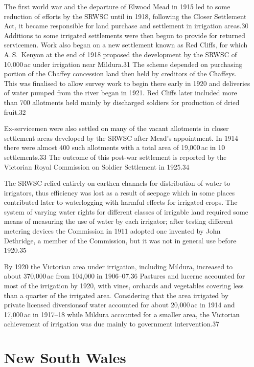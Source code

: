The first world war and the departure of Elwood Mead in 1915 led to
some reduction of efforts by the SRWSC until in 1918, following the
Closer Settlement Act, it became responsible for land purchase and
settlement in irrigation areas.30 Additions to some irrigated
settlements were then begun to provide for returned servicemen.  Work
also began on a new settlement known as Red Cliffs, for which
A.\,S.~Kenyon at the end of 1918 proposed the development by the SRWSC
of 10,000\,ac under irrigation near Mildura.31 The scheme depended on
purchasing portion of the Chaffey concession land then held by
creditors of the Chaffeys.  This was finalised to allow survey work to
begin there early in 1920 and deliveries of water pumped from the
river began in 1921.  Red Cliffs later included more than 700
allotments held mainly by discharged soldiers for production of dried
fruit.32

Ex-servicemen were also settled on many of the vacant allotments in
closer settlement areas developed by the SRWSC after Mead's
appointment.  In 1914 there were almost 400 such allotments with a
total area of 19,000\,ac in 10 settlements.33 The outcome of this
post-war settlement is reported by the Victorian Royal Commission on
Soldier Settlement in 1925.34

The SRWSC relied entirely on earthen channels for distribution of
water to irrigators, thus efficiency was lost as a result of seepage
which in some places contributed later to waterlogging with harmful
effects for irrigated crops.  The system of varying water rights for
different classes of irrigable land required some means of measuring
the use of water by each irrigator; after testing different metering
devices the Commission in 1911 adopted one invented by John Dethridge,
a member of the Commission, but it was not in general use before
1920.35

By 1920 the Victorian area under irrigation, including Mildura,
increased to about 370,000\,ac from 104,000 in 1906--07.36 Pastures
and lucerne accounted for most of the irrigation by 1920, with vines,
orchards and vegetables covering less than a quarter of the irrigated
area. Considering that the area irrigated by private licensed
diversionsof water accounted for about 20,000\,ac in 1914 and
17,000\,ac in 1917--18 while Mildura accounted for a smaller area, the
Victorian achievement of irrigation was due mainly to government
intervention.37

\section{New South Wales}

